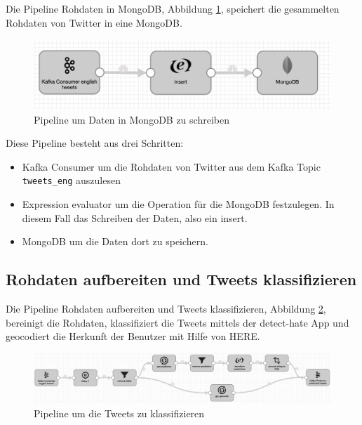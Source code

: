 Die Pipeline Rohdaten in MongoDB, Abbildung \ref{fig:pipeline_tweets_to_mongo}, speichert die gesammelten Rohdaten von Twitter in eine MongoDB. 

\begin{figure}[H]
	\centering
		\includegraphics[scale=0.4 ]{images/tweets_to_mongo.png}
	\caption{Pipeline um Daten in MongoDB zu schreiben}
	\label{fig:pipeline_tweets_to_mongo}
\end{figure}

Diese Pipeline besteht aus drei Schritten:

\begin{itemize}
  \item Kafka Consumer um die Rohdaten von Twitter aus dem Kafka Topic \texttt{tweets\_eng} auszulesen
  \item Expression evaluator um die Operation f{\"u}r die MongoDB festzulegen. In diesem Fall das Schreiben der Daten, also ein insert.
  \item MongoDB um die Daten dort zu speichern.
\end{itemize}

\subsection{Rohdaten aufbereiten und Tweets klassifizieren}
\label{sec:predict_tweets}

Die Pipeline Rohdaten aufbereiten und Tweets klassifizieren, Abbildung \ref{fig:pipeline_predict_tweets}, bereinigt die Rohdaten, klassifiziert die Tweets mittels der detect-hate App und geocodiert die Herkunft der Benutzer mit Hilfe von HERE. 

\begin{figure}[H]
	\centering
		\includegraphics[scale=0.3]{images/pipeline_predict_tweets.png}
	\caption{Pipeline um die Tweets zu klassifizieren}
	\label{fig:pipeline_predict_tweets}
\end{figure}

